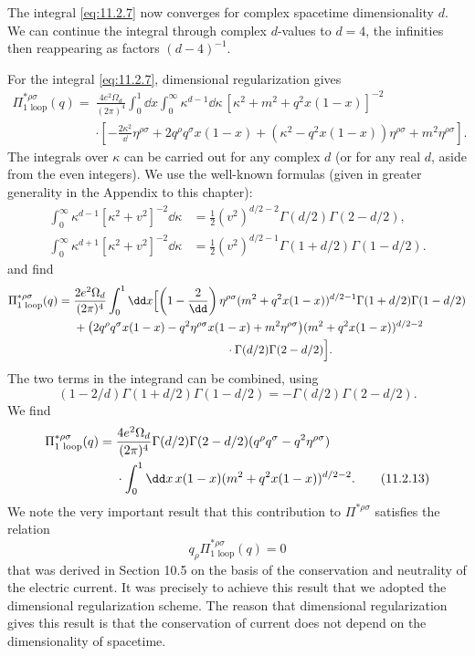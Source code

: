 The integral \eqref{eq:11.2.7} now converges for complex spacetime dimensionality
$d$. We can continue the integral through complex $d$-values to $d=4$,
the infinities then reappearing as factors $(d-4)^{-1}$.

For the integral \eqref{eq:11.2.7}, dimensional regularization gives
\begin{align*}
  \Pi_{\text{1 loop}}^{*\rho\sigma}(q)
  ={}&\frac{4e^2\Omega_d}{(2\pi)^4}\int_0^1\dd x\int_0^\infty
  \kappa^{d-1}\dd\kappa\,[\kappa^2+m^2+q^2x(1-x)]^{-2}\\
  &\cdot\left[-\frac{2\kappa^2}{\dd}\eta^{\rho\sigma}
  +2q^\rho q^\sigma x(1-x)
  +(\kappa^2-q^2x(1-x))\eta^{\rho\sigma}
  +m^2\eta^{\rho\sigma}\right].
\end{align*}
The integrals over $\kappa$ can be carried out for any complex $d$ (or for
any real $d$, aside from the even integers). We use the well-known formulas
(given in greater generality in the Appendix to this chapter):
\begin{align}
  \int_0^\infty\kappa^{d-1}[\kappa^2+v^2]^{-2}\dd\kappa
  &=\frac12(v^2)^{d/2-2}\Gamma(d/2)\Gamma(2-d/2),
  \tag{11.2.11}\label{eq:11.2.11}\\
  \int_0^\infty\kappa^{d+1}[\kappa^2+v^2]^{-2}\dd\kappa
  &=\frac12(v^2)^{d/2-1}\Gamma(1+d/2)\Gamma(1-d/2).
  \tag{11.2.12}\label{eq:11.2.12}
\end{align}
and find
\begin{align*}
  \Pi_{\text{1 loop}}^{*\rho\sigma}(q)
  ={}&\frac{2e^2\Omega_d}{(2\pi)^4}\int_0^1\dd x
  \Bigl[\left(1-\frac2\dd\right)\eta^{\rho\sigma}
  (m^2+q^2x(1-x))^{d/2-1}
  \Gamma(1+d/2)\Gamma(1-d/2)\\
  &+\bigl(2q^\rho q^\sigma x(1-x)-q^2\eta^{\rho\sigma}x(1-x)
  +m^2\eta^{\rho\sigma}\bigr)
  (m^2+q^2x(1-x))^{d/2-2}\\
  &\hspace{13em}\cdot\Gamma(d/2)\Gamma(2-d/2)\Bigr].
\end{align*}
The two terms in the integrand can be combined, using
\[
  (1-2/d)\Gamma(1+d/2)\Gamma(1-d/2)
  =-\Gamma(d/2)\Gamma(2-d/2).
\]
We find
\begin{align}
  \Pi_{\text{1 loop}}^{*\rho\sigma}(q)
  ={}&\frac{4e^2\Omega_d}{(2\pi)^4}
  \Gamma(d/2)\Gamma(2-d/2)(q^\rho q^\sigma-q^2\eta^{\rho\sigma})
  \notag\\
  &\cdot\int_0^1\dd x\,x(1-x)(m^2+q^2x(1-x))^{d/2-2}.
  \tag{11.2.13}\label{eq:11.2.13}
\end{align}
We note the very important result that this contribution to
$\Pi^{*\rho\sigma}$ satisfies the relation
\begin{equation}
  q_\rho\Pi_{\text{1 loop}}^{*\rho\sigma}(q)=0
  \tag{11.2.14}\label{eq:11.2.14}
\end{equation}
that was derived in Section 10.5 on the basis of the conservation and
neutrality of the electric current. It was precisely to achieve this result
that we adopted the dimensional regularization scheme. The reason that
dimensional regularization gives this result is that the conservation of
current does not depend on the dimensionality of spacetime.

